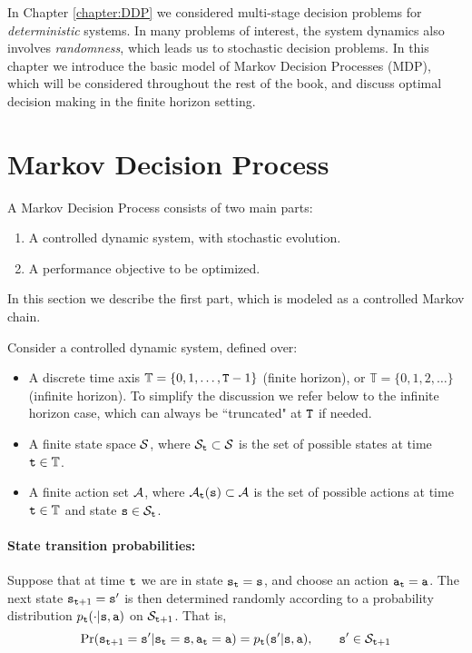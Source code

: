
In  Chapter \ref{chapter:DDP} we considered multi-stage decision
problems for \emph{deterministic} systems. In many problems of
interest, the system dynamics also involves \emph{randomness}, which
leads us to stochastic decision problems. In this chapter we
introduce the basic model of Markov Decision Processes (MDP), which
will be considered throughout the rest of the book, and discuss optimal decision making in the finite
horizon setting.



\section{Markov Decision Process}

A Markov Decision Process consists of two main parts:
\begin{enumerate}
  \item A controlled dynamic system, with stochastic evolution.
  \item A performance objective to be optimized.
\end{enumerate}
In this section we describe the first part, which is modeled as a controlled Markov chain.

Consider a controlled dynamic system, defined over:
\begin{itemize}
  \item A discrete time axis ${\mathbb{T}} = \{ 0,1, \ldots ,{\tt T} - 1\} $  (finite horizon), or
  ${\mathbb{T}} = \{ 0,1,2, \ldots \} $ (infinite horizon).
To simplify the discussion we refer below to the infinite horizon
case, which can always be ``truncated" at ${\tt T}$ if needed.
  \item A finite state space $\mathcal{S}$, where ${\mathcal{S}_{\tt t}} \subset \mathcal{S}$ is the set of possible states at time ${\tt t}\in {\mathbb{T}}$.
  \item A finite action set $\mathcal{A}$, where ${\mathcal{A}_{\tt t}}({\tt s}) \subset \mathcal{A}$ is the set of possible actions at time ${\tt t}\in {\mathbb{T}}$ and state ${\tt s} \in {\mathcal{S}_{\tt t}}$.
\end{itemize}

\paragraph{State transition probabilities:}
Suppose that at time ${\tt t}$ we are in state ${{\tt s}_{\tt t}} = {\tt s}$, and choose an action ${{\tt a}_{\tt t}} = {\tt a}$. The next state ${{\tt s}_{{\tt t} + 1}} = {\tt s}'$ is then determined randomly according to a probability distribution  ${p_{\tt t}}( \cdot |{\tt s},{\tt a})$ on ${\mathcal{S}_{{\tt t} + 1}}$. That is,
\[\Pr({{\tt s}_{{\tt t} + 1}} = {\tt s}'|{{\tt s}_{\tt t}} = {\tt s},{{\tt a}_{\tt t}} = {\tt a}) = {p_{\tt t}}({\tt s}'|{\tt s},{\tt a}),\quad      \quad {\tt s}' \in {\mathcal{S}_{{\tt t}+ 1}}\]

